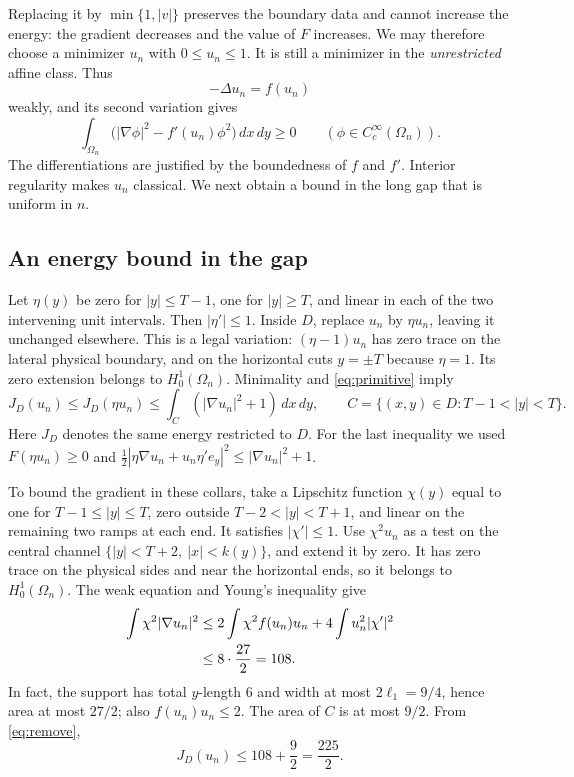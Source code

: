 \documentclass[11pt]{article}
\begin{document}
Replacing it by \(\min\{1,|v|\}\) preserves the boundary data and cannot
increase the energy: the gradient decreases and the value of \(F\)
increases. We may therefore choose a minimizer \(u_n\) with
\(0\le u_n\le1\). It is still a minimizer in the \emph{unrestricted}
affine class. Thus
\[
 -\Delta u_n=f(u_n)
\]
weakly, and its second variation gives
\begin{equation}\label{eq:stable}
 \int_{\Omega_n}\bigl(|\nabla\phi|^2-f'(u_n)\phi^2\bigr)\,dx\,dy
 \ge0\qquad(\phi\in C_c^\infty(\Omega_n)).
\end{equation}
The differentiations are justified by the boundedness of \(f\) and
\(f'\). Interior regularity makes \(u_n\) classical.
We next obtain a bound in the long gap that is uniform in \(n\).

\subsection{An energy bound in the gap}

Let \(\eta(y)\) be zero for \(|y|\le T-1\), one for \(|y|\ge T\),
and linear in each of the two intervening unit intervals.
Then \(|\eta'|\le1\). Inside \(D\), replace \(u_n\) by \(\eta u_n\),
leaving it unchanged elsewhere. This is a legal variation:
\((\eta-1)u_n\) has zero trace on the lateral physical boundary,
and on the horizontal cuts \(y=\pm T\) because \(\eta=1\).
Its zero extension belongs to \(H^1_0(\Omega_n)\).
Minimality and \eqref{eq:primitive} imply
\begin{equation}\label{eq:remove}
 J_D(u_n)\le J_D(\eta u_n)
 \le\int_C(|\nabla u_n|^2+1)\,dx\,dy,
 \qquad C=\{(x,y)\in D:T-1<|y|<T\}.
\end{equation}
Here \(J_D\) denotes the same energy restricted to \(D\).
For the last inequality we used \(F(\eta u_n)\ge0\) and
\(\tfrac12|\eta\nabla u_n+u_n\eta'e_y|^2
 \le|\nabla u_n|^2+1\).

To bound the gradient in these collars, take a Lipschitz function
\(\chi(y)\) equal to one for \(T-1\le|y|\le T\), zero outside
\(T-2<|y|<T+1\), and linear on the remaining two ramps at each end.
It satisfies \(|\chi'|\le1\).
Use \(\chi^2u_n\) as a test on the central channel
\(\{|y|<T+2,\ |x|<k(y)\}\), and extend it by zero.
It has zero trace on the physical sides and near the horizontal ends,
so it belongs to \(H^1_0(\Omega_n)\).
The weak equation and Young's inequality give
\begin{align}
 \int\chi^2|\nabla u_n|^2
 &\le2\int\chi^2 f(u_n)u_n
       +4\int u_n^2|\chi'|^2 \notag\\
 &\le8\cdot\frac{27}{2}=108. \label{eq:caccioppoli}
\end{align}
In fact, the support has total \(y\)-length \(6\) and width at most
\(2\ell_1=9/4\), hence area at most \(27/2\); also \(f(u_n)u_n\le2\).
The area of \(C\) is at most \(9/2\). From \eqref{eq:remove},
\begin{equation}\label{eq:neck-energy}
 J_D(u_n)\le108+\frac92=\frac{225}{2}.
\end{equation}
\end{document}
